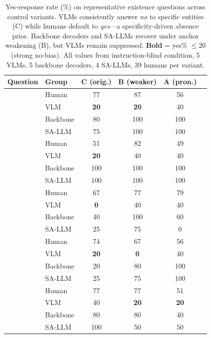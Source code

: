 \begin{table}[h]
\centering
\small
\setlength{\tabcolsep}{4pt}
\renewcommand{\arraystretch}{0.95}
\begin{tabular}{llcccc}
\toprule
\textbf{Question} & \textbf{Group} & \textbf{C (orig.)} & \textbf{B (weaker)} & \textbf{A (pron.)} \\
\midrule
{}
 & Human & 77 & 87 & 56 \\
 & VLM & \textbf{20} & \textbf{20} & 40 \\
 & Backbone & 80 & 100 & 100 \\
 & SA-LLM & 75 & 100 & 100 \\
\midrule
{}
 & Human & 51 & 82 & 49 \\
 & VLM & \textbf{20} & 40 & 40 \\
 & Backbone & 100 & 100 & 100 \\
 & SA-LLM & 100 & 100 & 100 \\
\midrule
{}
 & Human & 67 & 77 & 79 \\
 & VLM & \textbf{0} & 40 & 40 \\
 & Backbone & 40 & 100 & 60 \\
 & SA-LLM & 25 & 75 & 0 \\
\midrule
{}
 & Human & 74 & 67 & 56 \\
 & VLM & \textbf{20} & \textbf{0} & 40 \\
 & Backbone & 20 & 80 & 100 \\
 & SA-LLM & 25 & 75 & 100 \\
\midrule
{}
 & Human & 77 & 77 & 51 \\
 & VLM & 40 & \textbf{20} & \textbf{20} \\
 & Backbone & 80 & 80 & 40 \\
 & SA-LLM & 100 & 50 & 50 \\
\bottomrule
\end{tabular}
\caption{Yes-response rate (\%) on representative existence questions across control variants. VLMs consistently answer \textit{no} to specific entities (C) while humans default to \textit{yes}---a specificity-driven absence prior. Backbone decoders and SA-LLMs recover under anchor weakening (B), but VLMs remain suppressed. \textbf{Bold} = yes\% ${\leq}20$ (strong no-bias). All values from instruction-blind condition, 5 VLMs, 5 backbone decoders, 4 SA-LLMs, 39 humans per variant.}
\label{tab:exist_example_responses}
\end{table}
